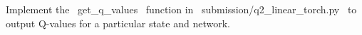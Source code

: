 \item {}
Implement the ~get_q_values~ function in ~submission/q2_linear_torch.py~ to output Q-values for a particular state and network.